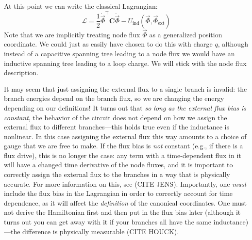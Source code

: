 At this point we can write the classical Lagrangian:
\begin{equation}
\label{eq:Lagrangianfluxonly}
\mathcal{L} = \frac{1}{2}\dot{\vec{\Phi}}^\top\mathbf{C}\dot{\vec{\Phi}}-U_\mathrm{ind}(\vec{\Phi}, \vec{\Phi}_\mathrm{ext})
\end{equation}
Note that we are implicitly treating node flux $\vec{\Phi}$ as a generalized position coordinate. We could just as easily have chosen to do this with charge $q$, although instead of a capacitive spanning tree leading to a node flux we would have an inductive spanning tree leading to a loop charge. We will stick with the node flux description.

It may seem that just assigning the external flux to a single branch is invalid: the branch energies depend on the branch flux, so we are changing the energy depending on our definitions! It turns out that \textit{so long as the external flux bias is constant}, the behavior of the circuit does not depend on how we assign the external flux to different branches---this holds true even if the inductance is nonlinear. In this case assigning the external flux this way amounts to a choice of gauge that we are free to make. If the flux bias is \textit{not} constant (e.g., if there is a flux drive), this is no longer the case: any term with a time-dependent flux in it will have a changed time derivative of the node fluxes, and it is important to correctly assign the external flux to the branches in a way that is physically accurate. For more information on this, see (CITE JENS). Importantly, one \textit{must} include the flux bias in the Lagrangian in order to correctly account for time dependence, as it will affect the \textit{definition} of the canonical coordinates. One must not derive the Hamiltonian first and then put in the flux bias later (although it turns out you can get away with it if your branches all have the same inductance)---the difference is physically measurable (CITE HOUCK).

